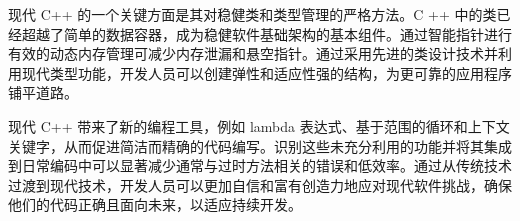现代 C++ 的一个关键方面是其对稳健类和类型管理的严格方法。C ++ 中的类已经超越了简单的数据容器，成为稳健软件基础架构的基本组件。通过智能指针进行有效的动态内存管理可减少内存泄漏和悬空指针。通过采用先进的类设计技术并利用现代类型功能，开发人员可以创建弹性和适应性强的结构，为更可靠的应用程序铺平道路。

现代 C++ 带来了新的编程工具，例如 lambda 表达式、基于范围的循环和上下文关键字，从而促进简洁而精确的代码编写。识别这些未充分利用的功能并将其集成到日常编码中可以显著减少通常与过时方法相关的错误和低效率。通过从传统技术过渡到现代技术，开发人员可以更加自信和富有创造力地应对现代软件挑战，确保他们的代码正确且面向未来，以适应持续开发。
